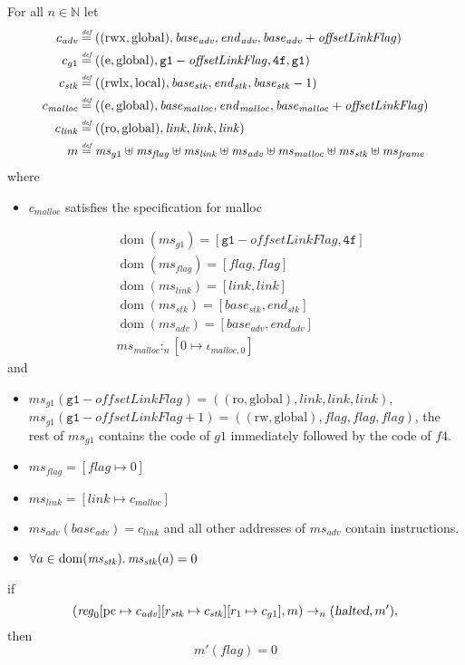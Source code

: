\documentclass[a4paper]{article}
\newcommand{\update}[2]{[#1 \mapsto #2]}
\newcommand{\defeq}{\stackrel{\textit{\tiny{def}}}{=}}
\DeclareMathOperator{\dom}{dom}
\newcommand{\var}[1]{\mathit{#1}}
\newcommand{\hs}{\var{ms}}
\newcommand{\ms}{\hs}
\newcommand{\pcreg}{\mathrm{pc}}
\newcommand{\start}{\var{base}}
\newcommand{\addrend}{\var{end}}
\newcommand{\reg}{\var{reg}}
\newcommand{\heap}{\var{mem}}
\newcommand{\adv}{\var{adv}}
\newcommand{\link}{\var{link}}
\newcommand{\stk}{\var{stk}}
\newcommand{\flag}{\var{flag}}
\newcommand{\pwl}{\var{pwl}}
\newcommand{\olf}{\var{offsetLinkFlag}}
\newcommand{\halted}{\textsl{halted}}
\newcommand{\heapSat}[3][\heap]{#1 :_{#2} #3}
\newcommand{\memSat}[3][n]{\heapSat[#2]{#1}{#3}}
\newcommand{\codelabel}[1]{\mathit{#1}}
\newcommand{\malloc}{\codelabel{malloc}}
\newcommand{\nats}{\mathbb{N}}
\newcommand{\plainperm}[1]{\mathrm{#1}}
\newcommand{\readonly}{\plainperm{ro}}
\newcommand{\readwrite}{\plainperm{rw}}
\newcommand{\entry}{\plainperm{e}}
\newcommand{\rwx}{\plainperm{rwx}}
\newcommand{\rwlx}{\plainperm{rwlx}}
\newcommand{\local}{\plainperm{local}}
\newcommand{\glob}{\plainperm{global}}
\newcommand{\step}[1][]{\rightarrow_{#1}}
\begin{document}
\begin{lemma}[Correctness of $g1$]
  \label{lem:correctness-g1}
  For all $n \in \nats$
  let
  \begin{align*}
    c_{\var{adv}} & \defeq ((\rwx,\glob),\start_{\adv},\addrend_{\adv},\start_{\adv}+\olf) \\
    c_{g1} & \defeq ((\entry,\glob),\mathtt{g1}-\olf,\mathtt{4f},\mathtt{g1}) \\
    c_\stk & \defeq ((\rwlx,\local),\start_\stk,\addrend_\stk,\start_\stk-1) \\
    c_\malloc & \defeq ((\entry,\glob),\start_\malloc,\addrend_\malloc,\start_\malloc+\olf) \\
    c_\link & \defeq ((\readonly,\glob),\link,\link,\link) \\
    m & \defeq \hs_{g1} \uplus 
        \ms_\flag \uplus                
        \ms_\link \uplus 
        \ms_\adv \uplus 
        \ms_\malloc \uplus 
        \ms_\stk \uplus
        \ms_{\var{frame}} 
  \end{align*}
  where 
  \begin{itemize}
  \item $c_\malloc$ satisfies the specification for malloc
  \end{itemize}
  \begin{align*}
    &\dom(\hs_{g1}) = [\mathtt{g1}-\olf,\mathtt{4f}] \\
    &\dom(\hs_\flag) = [\flag,\flag] \\
    &\dom(\ms_\link) = [\link,\link]\\
    &\dom(\ms_\stk) = [\start_\stk, \addrend_\stk]\\
    &\dom(\hs_{\adv}) = [\start_\adv,\addrend_\adv] \\
    &\heapSat[\hs_{\malloc}]{n}{[0 \mapsto \iota_{\malloc,0}]}
  \end{align*}
  and
  \begin{itemize}
  \item $\ms_{g1}(\mathtt{g1}-\olf) = ((\readonly,\glob),\link,\link,\link)$, $\ms_{g1}(\mathtt{g1}-\olf+1) = ((\readwrite,\glob),\flag,\flag,\flag)$, the rest of $\hs_{g1}$ contains the code of $g1$ immediately followed by the code of $f4$.
  \item $\ms_\flag = [\flag \mapsto 0]$
  \item $\ms_{\var{link}} = [\link \mapsto c_\malloc]$
  \item $\hs_\adv(\start_\adv) = c_\link$ and all other addresses of $\ms_\adv$ contain instructions.
  \item $\forall a \in \dom(\ms_\stk) \ldotp \ms_\stk(a) = 0$ %
  \end{itemize}
  if 
  \[
    (\reg_0\update{\pcreg}{c_\adv}\update{r_\stk}{c_\stk}\update{r_1}{c_{g1}},m) \step[n] (\halted,m'),
  \]
  then
  \[
    m'(\flag) = 0
  \]  
\end{lemma}
\end{document}

